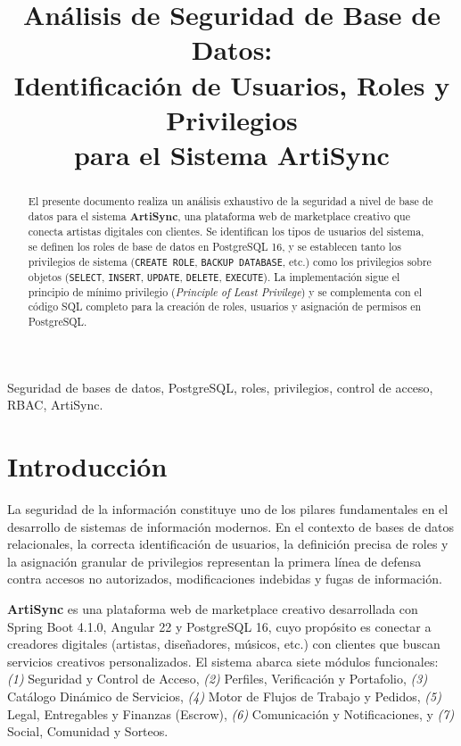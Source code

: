 \documentclass[conference, onecolumn]{IEEEtran}
\title{Análisis de Seguridad de Base de Datos:\\
Identificación de Usuarios, Roles y Privilegios\\
para el Sistema ArtiSync}
\author{
\IEEEauthorblockN{Bone Niurca\IEEEauthorrefmark{1},
Carvajal Johan\IEEEauthorrefmark{1},
Figueroa Bryan\IEEEauthorrefmark{1},
Rios Jhon\IEEEauthorrefmark{1}}
\IEEEauthorblockA{\IEEEauthorrefmark{1}Facultad de Ciencias de la Ingeniería\\
Universidad Técnica Estatal de Quevedo\\
Quevedo, Los Ríos, Ecuador}
}
\begin{document}
\maketitle

\begin{abstract}
El presente documento realiza un análisis exhaustivo de la seguridad a nivel de base de datos para el sistema \textbf{ArtiSync}, una plataforma web de marketplace creativo que conecta artistas digitales con clientes. Se identifican los tipos de usuarios del sistema, se definen los roles de base de datos en PostgreSQL 16, y se establecen tanto los privilegios de sistema (\texttt{CREATE ROLE}, \texttt{BACKUP DATABASE}, etc.) como los privilegios sobre objetos (\texttt{SELECT}, \texttt{INSERT}, \texttt{UPDATE}, \texttt{DELETE}, \texttt{EXECUTE}). La implementación sigue el principio de mínimo privilegio (\textit{Principle of Least Privilege}) y se complementa con el código SQL completo para la creación de roles, usuarios y asignación de permisos en PostgreSQL.
\end{abstract}

\begin{IEEEkeywords}
Seguridad de bases de datos, PostgreSQL, roles, privilegios, control de acceso, RBAC, ArtiSync.
\end{IEEEkeywords}

\section{Introducción}

La seguridad de la información constituye uno de los pilares fundamentales en el desarrollo de sistemas de información modernos. En el contexto de bases de datos relacionales, la correcta identificación de usuarios, la definición precisa de roles y la asignación granular de privilegios representan la primera línea de defensa contra accesos no autorizados, modificaciones indebidas y fugas de información.

\textbf{ArtiSync} es una plataforma web de marketplace creativo desarrollada con Spring Boot 4.1.0, Angular 22 y PostgreSQL 16, cuyo propósito es conectar a creadores digitales (artistas, diseñadores, músicos, etc.) con clientes que buscan servicios creativos personalizados. El sistema abarca siete módulos funcionales: \textit{(1)} Seguridad y Control de Acceso, \textit{(2)} Perfiles, Verificación y Portafolio, \textit{(3)} Catálogo Dinámico de Servicios, \textit{(4)} Motor de Flujos de Trabajo y Pedidos, \textit{(5)} Legal, Entregables y Finanzas (Escrow), \textit{(6)} Comunicación y Notificaciones, y \textit{(7)} Social, Comunidad y Sorteos.
\end{document}
